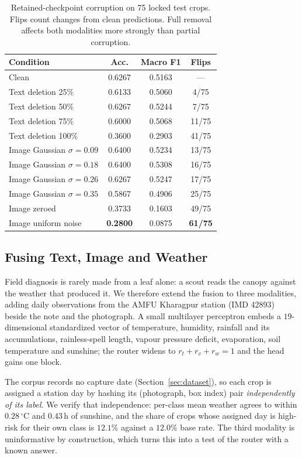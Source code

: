 \documentclass[conference]{IEEEtran}
\begin{document}
\begin{table}[t]
\caption{Retained-checkpoint corruption on 75 locked test crops. Flips count changes from clean predictions. Full removal affects both modalities more strongly than partial corruption.}
\label{tab:corruption}
\centering\footnotesize
\setlength\tabcolsep{4pt}
\begin{tabular}{lccc}
\toprule
\textbf{Condition} & \textbf{Acc.} & \textbf{Macro F1} & \textbf{Flips}\\
\midrule
Clean & 0.6267 & 0.5163 & ---\\
\midrule
Text deletion 25\% & 0.6133 & 0.5060 & 4/75\\
Text deletion 50\% & 0.6267 & 0.5244 & 7/75\\
Text deletion 75\% & 0.6000 & 0.5068 & 11/75\\
Text deletion 100\% & 0.3600 & 0.2903 & 41/75\\
\midrule
Image Gaussian $\sigma{=}0.09$ & 0.6400 & 0.5234 & 13/75\\
Image Gaussian $\sigma{=}0.18$ & 0.6400 & 0.5308 & 16/75\\
Image Gaussian $\sigma{=}0.26$ & 0.6267 & 0.5247 & 17/75\\
Image Gaussian $\sigma{=}0.35$ & 0.5867 & 0.4906 & 25/75\\
\midrule
Image zeroed & 0.3733 & 0.1603 & 49/75\\
Image uniform noise & \textbf{0.2800} & 0.0875 & \textbf{61/75}\\
\bottomrule
\end{tabular}
\end{table}

\subsection{Fusing Text, Image and Weather}
\label{sec:weather_probe}

Field diagnosis is rarely made from a leaf alone: a scout reads the canopy
against the weather that produced it. We therefore extend the fusion to three
modalities, adding daily observations from the AMFU Kharagpur station
(IMD 42893) beside the note and the photograph. A small multilayer perceptron
embeds a $19$-dimensional standardized vector of temperature, humidity, rainfall
and its accumulations, rainless-spell length, vapour pressure deficit,
evaporation, soil temperature and sunshine; the router widens to
$r_t+r_v+r_w=1$ and the head gains one block.

The corpus records no capture date (Section~\ref{sec:dataset}), so each crop is
assigned a station day by hashing its (photograph, box index) pair
\emph{independently of its label}. We verify that independence: per-class mean
weather agrees to within $0.28\,^{\circ}$C and $0.43$\,h of sunshine, and the
share of crops whose assigned day is high-risk for their own class is $12.1\%$
against a $12.0\%$ base rate. The third modality is uninformative by
construction, which turns this into a test of the router with a known answer.
\end{document}

